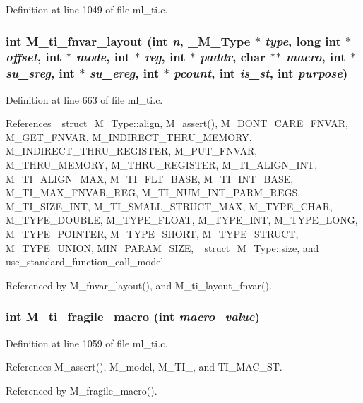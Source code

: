 Definition at line 1049 of file ml\_\-ti.c.
\subsubsection{\setlength{\rightskip}{0pt plus 5cm}int M\_\-ti\_\-fnvar\_\-layout (int {\em n}, \bf{\_\-M\_\-Type} $\ast$ {\em type}, long int $\ast$ {\em offset}, int $\ast$ {\em mode}, int $\ast$ {\em reg}, int $\ast$ {\em paddr}, char $\ast$$\ast$ {\em macro}, int $\ast$ {\em su\_\-sreg}, int $\ast$ {\em su\_\-ereg}, int $\ast$ {\em pcount}, int {\em is\_\-st}, int {\em purpose})}\label{ml__ti_8c_2e3c9aee819e829a2bee9c7a18c82e5f}




Definition at line 663 of file ml\_\-ti.c.

References \_\-struct\_\-M\_\-Type::align, M\_\-assert(), M\_\-DONT\_\-CARE\_\-FNVAR, M\_\-GET\_\-FNVAR, M\_\-INDIRECT\_\-THRU\_\-MEMORY, M\_\-INDIRECT\_\-THRU\_\-REGISTER, M\_\-PUT\_\-FNVAR, M\_\-THRU\_\-MEMORY, M\_\-THRU\_\-REGISTER, M\_\-TI\_\-ALIGN\_\-INT, M\_\-TI\_\-ALIGN\_\-MAX, M\_\-TI\_\-FLT\_\-BASE, M\_\-TI\_\-INT\_\-BASE, M\_\-TI\_\-MAX\_\-FNVAR\_\-REG, M\_\-TI\_\-NUM\_\-INT\_\-PARM\_\-REGS, M\_\-TI\_\-SIZE\_\-INT, M\_\-TI\_\-SMALL\_\-STRUCT\_\-MAX, M\_\-TYPE\_\-CHAR, M\_\-TYPE\_\-DOUBLE, M\_\-TYPE\_\-FLOAT, M\_\-TYPE\_\-INT, M\_\-TYPE\_\-LONG, M\_\-TYPE\_\-POINTER, M\_\-TYPE\_\-SHORT, M\_\-TYPE\_\-STRUCT, M\_\-TYPE\_\-UNION, MIN\_\-PARAM\_\-SIZE, \_\-struct\_\-M\_\-Type::size, and use\_\-standard\_\-function\_\-call\_\-model.

Referenced by M\_\-fnvar\_\-layout(), and M\_\-ti\_\-layout\_\-fnvar().
\subsubsection{\setlength{\rightskip}{0pt plus 5cm}int M\_\-ti\_\-fragile\_\-macro (int {\em macro\_\-value})}\label{ml__ti_8c_25627f2dfedd6c390f72b04a0d380ccc}




Definition at line 1059 of file ml\_\-ti.c.

References M\_\-assert(), M\_\-model, M\_\-TI\_, and TI\_\-MAC\_\-ST.

Referenced by M\_\-fragile\_\-macro().
